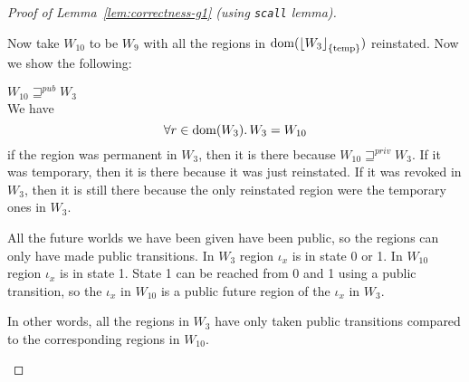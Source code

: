 \documentclass[a4paper]{article}
\DeclarePairedDelimiter\floor{\lfloor}{\rfloor}
\DeclareMathOperator{\dom}{dom}
\newcommand{\var}[1]{\mathit{#1}}
\newcommand{\erase}[2]{\floor*{#1}_{\{#2\}}}
\newcommand{\futurewk}{\mathbin{\sqsupseteq}^{\var{pub}}}
\newcommand{\futurestr}{\mathbin{\sqsupseteq}^{\var{priv}}}
\newcommand{\plainview}[1]{\mathrm{#1}}
\newcommand{\temp}{\plainview{temp}}
\begin{document}
\begin{proof}[Proof of Lemma~\ref{lem:correctness-g1} (using \texttt{scall} lemma)]
\begin{enumproof}[resume]
\begin{enumproof}
            Now take $W_{10}$ to be $W_9$ with all the regions in $\dom(\erase{W_3}{\temp})$ reinstated. Now we show the following:
            \begin{enumproof}
            \item $W_{10} \futurewk W_3$ \label{g1:w10futwkw3}\\
              We have
              \[
                \forall r \in \dom(W_3) \ldotp W_3 = W_{10}
              \]
              if the region was permanent in $W_3$, then it is there because $W_{10} \futurestr W_3$. If it was temporary, then it is there because it was just reinstated. If it was revoked in $W_3$, then it is still there because the only reinstated region were the temporary ones in $W_3$.

              All the future worlds we have been given have been public, so the regions can only have made public transitions. In $W_3$ region $\iota_x$ is in state 0 or 1. In $W_{10}$ region $\iota_x$ is in state 1. State 1 can be reached from 0 and 1 using a public transition, so the $\iota_x$ in $W_{10}$ is a public future region of the $\iota_x$ in $W_3$.

              In other words, all the regions in $W_3$ have only taken public transitions compared to the corresponding regions in $W_{10}$.


\end{enumproof}
\end{enumproof}
\end{enumproof}
\end{proof}
\end{document}
